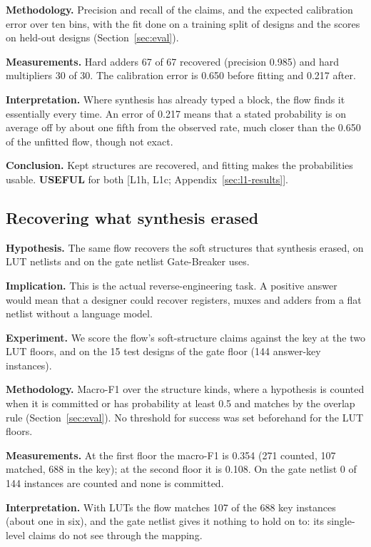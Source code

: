 \documentclass[conference]{IEEEtran}
\newcommand{\verdict}[1]{\textbf{\textsc{#1}}}
\newcommand{\hev}[1]{\par\smallskip\noindent\textbf{#1}}
\begin{document}
\hev{Methodology.} Precision and recall of the claims, and the expected calibration error over ten bins, with the fit done on a training split of designs and the scores on held-out designs (Section~\ref{sec:eval}).

\hev{Measurements.} Hard adders 67 of 67 recovered (precision 0.985) and hard multipliers 30 of 30. The calibration error is 0.650 before fitting and 0.217 after.

\hev{Interpretation.} Where synthesis has already typed a block, the flow finds it essentially every time. An error of 0.217 means that a stated probability is on average off by about one fifth from the observed rate, much closer than the 0.650 of the unfitted flow, though not exact.

\hev{Conclusion.} Kept structures are recovered, and fitting makes the probabilities usable. \verdict{USEFUL} for both [L1h, L1c; Appendix~\ref{sec:l1-results}].

\subsection{Recovering what synthesis erased}
\label{arg:ra3}

\hev{Hypothesis.} The same flow recovers the soft structures that synthesis erased, on LUT netlists and on the gate netlist Gate-Breaker uses.

\hev{Implication.} This is the actual reverse-engineering task. A positive answer would mean that a designer could recover registers, muxes and adders from a flat netlist without a language model.

\hev{Experiment.} We score the flow's soft-structure claims against the key at the two LUT floors, and on the 15 test designs of the gate floor (144 answer-key instances).

\hev{Methodology.} Macro-F1 over the structure kinds, where a hypothesis is counted when it is committed or has probability at least 0.5 and matches by the overlap rule (Section~\ref{sec:eval}). No threshold for success was set beforehand for the LUT floors.

\hev{Measurements.} At the first floor the macro-F1 is 0.354 (271 counted, 107 matched, 688 in the key); at the second floor it is 0.108. On the gate netlist 0 of 144 instances are counted and none is committed.

\hev{Interpretation.} With LUTs the flow matches 107 of the 688 key instances (about one in six), and the gate netlist gives it nothing to hold on to: its single-level claims do not see through the mapping.
\end{document}

